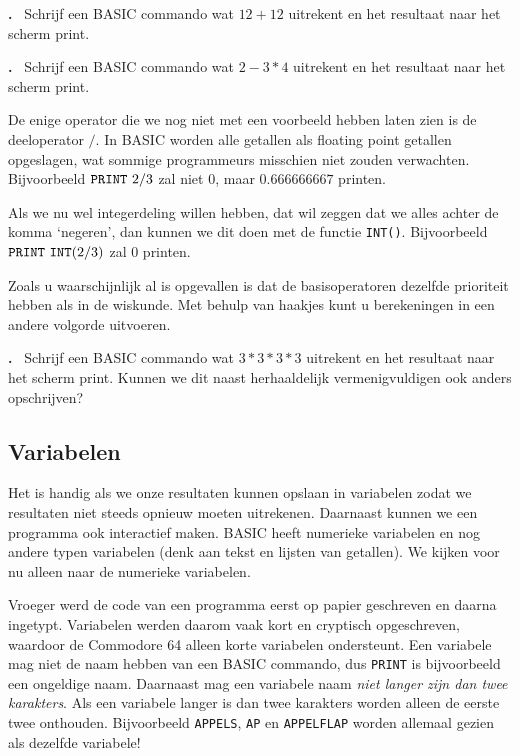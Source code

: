 \documentclass{article}
\newcounter{problem}
\newcounter{solution}
\newcommand\problem{%
  \stepcounter{problem}%
  \textbf{\theproblem.}~%
  \setcounter{solution}{0}%
}
\begin{document}
\problem Schrijf een BASIC commando wat $12 + 12$ uitrekent en het resultaat naar het scherm print.

\problem Schrijf een BASIC commando wat $2 - 3 * 4$ uitrekent en het resultaat naar het scherm print.

De enige operator die we nog niet met een voorbeeld hebben laten zien is de deeloperator $/$.
In BASIC worden alle getallen als floating point getallen opgeslagen, wat sommige programmeurs misschien niet zouden verwachten.
Bijvoorbeeld $\verb:PRINT:\ 2/3$ zal niet $0$, maar $0.666666667$ printen.

Als we nu wel integerdeling willen hebben, dat wil zeggen dat we alles achter de komma `negeren',
dan kunnen we dit doen met de functie \verb:INT():.
Bijvoorbeeld $\verb:PRINT:\ \verb:INT:(2/3)$ zal $0$ printen.

Zoals u waarschijnlijk al is opgevallen is dat de basisoperatoren dezelfde prioriteit hebben als in de wiskunde.
Met behulp van haakjes kunt u berekeningen in een andere volgorde uitvoeren.

\problem Schrijf een BASIC commando wat $3*3*3*3$ uitrekent en het resultaat naar het scherm print.
Kunnen we dit naast herhaaldelijk vermenigvuldigen ook anders opschrijven?

\subsection{Variabelen}

Het is handig als we onze resultaten kunnen opslaan in variabelen zodat we resultaten niet steeds opnieuw moeten uitrekenen.
Daarnaast kunnen we een programma ook interactief maken.
BASIC heeft numerieke variabelen en nog andere typen variabelen (denk aan tekst en lijsten van getallen).
We kijken voor nu alleen naar de numerieke variabelen.

Vroeger werd de code van een programma eerst op papier geschreven en daarna ingetypt.
Variabelen werden daarom vaak kort en cryptisch opgeschreven, waardoor de Commodore 64 alleen korte variabelen ondersteunt.
Een variabele mag niet de naam hebben van een BASIC commando, dus \verb:PRINT: is bijvoorbeeld een ongeldige naam.
Daarnaast mag een variabele naam \emph{niet langer zijn dan twee karakters}.
Als een variabele langer is dan twee karakters worden alleen de eerste twee onthouden.
Bijvoorbeeld \verb:APPELS:, \verb:AP: en \verb:APPELFLAP: worden allemaal gezien als dezelfde variabele!
\end{document}
